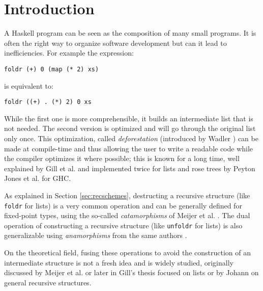 \documentclass[format=sigplan, review=true, anonymous=true]{acmart}
\newcommand{\hs}[1]{\texttt{#1}}
\begin{document}
\section{Introduction}

A Haskell program can be seen as the composition of many small programs. It is often the right way to organize software development but can it lead to inefficiencies. For example the expression:
\begin{verbatim}
foldr (+) 0 (map (* 2) xs)
\end{verbatim}
is equivalent to:
\begin{verbatim}
foldr ((+) . (*) 2) 0 xs
\end{verbatim}

\noindent While the first one is more comprehensible, it builds an intermediate list that is not needed. The second version is optimized and will go through the original list only once.
This optimization, called \emph{deforestation} (introduced by Wadler \cite{WADLER1990231}) can be made at compile-time and thus allowing the user to write a readable code while the compiler optimizes it where possible; this is known for a long time, well explained by Gill et al. \cite{Gill:1993:SCD:165180.165214} and implemented twice for lists and rose trees by Peyton Jones et al. \cite{pbr} for GHC.

As explained in Section \ref{sec:recschemes}, destructing a recursive structure (like \hs{foldr} for lists) is a very common operation and can be generally defined for fixed-point types, using the so-called \emph{catamorphisms} of Meijer et al. \cite{4cec4a43c86444479dc0003182424795}. The dual operation of constructing a recursive structure (like \hs{unfoldr} for lists) is also generalizable using \emph{anamorphisms} from the same authors \cite{4cec4a43c86444479dc0003182424795}.

On the theoretical field, fusing these operations to avoid the construction of an intermediate structure is not a fresh idea and is widely studied, originally discussed by Meijer et al. \cite{4cec4a43c86444479dc0003182424795} or later in Gill's thesis \cite{Gill1996CheapDF} focused on lists or by Johann \cite{Johann:2002:GSF:641433.641471} on general recursive structures.
\end{document}
